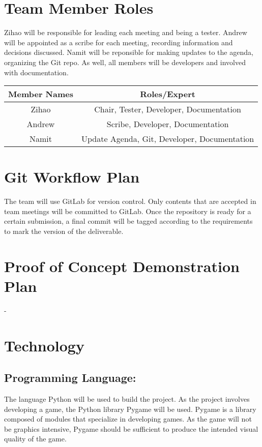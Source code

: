 \documentclass{article}
\begin{document}
\section{Team Member Roles}

Zihao will be responsible for leading each meeting and being a tester. Andrew will be appointed as a scribe for each meeting, recording information and decisions discussed. Namit will be reponsible for making updates to the agenda, organizing the Git repo. As well, all members will be developers and involved with documentation.

\begin{table}[h]
    \centering
    \begin{tabular}{|c|c|}
    \hline
         Member Names & Roles/Expert  \\
         \hline
         Zihao & Chair, Tester, Developer, Documentation \\
         \hline
         Andrew & Scribe, Developer, Documentation \\
         \hline
         Namit & Update Agenda, Git, Developer, Documentation \\
         \hline
    \end{tabular}
    \label{tab:my_label}
\end{table}

\section{Git Workflow Plan}
The team will use GitLab for version control. Only contents that are accepted in team meetings will be committed to GitLab. Once the repository is ready for a certain submission, a final commit will be tagged according to the requirements to mark the version of the deliverable.

\section{Proof of Concept Demonstration Plan}
- 


\section{Technology}
\subsection{Programming Language: }
The language Python will be used to build the project. As the project involves developing a game, the Python library Pygame will be used. Pygame is a library composed of modules that specialize in developing games. As the game will not be graphics intensive, Pygame should be sufficient to produce the intended visual quality of the game.  
\end{document}
